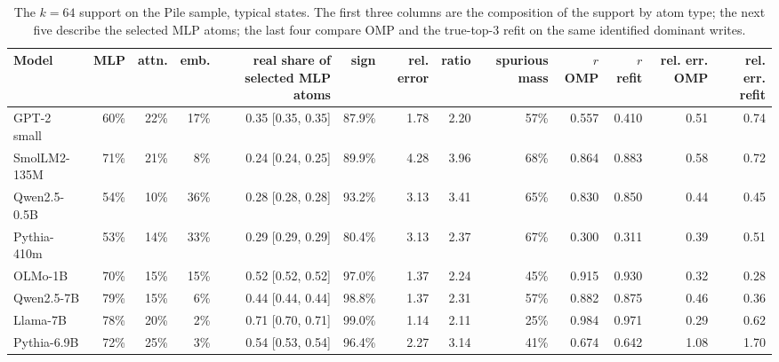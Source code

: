 \begin{table}[H]\centering\scriptsize
\caption{The $k=64$ support on the Pile sample, typical states. The first three columns are the composition of the support by atom type; the next five describe the selected MLP atoms; the last four compare OMP and the true-top-3 refit on the same identified dominant writes.}\label{app:z6-pile}
\begin{adjustbox}{max width=\linewidth}
\begin{tabular}{lrrrrrrrrrrrr}\toprule
Model & MLP & attn. & emb. & real share of selected MLP atoms & sign & rel. error & ratio & spurious mass & $r$ OMP & $r$ refit & rel. err. OMP & rel. err. refit \\ \midrule
GPT-2 small & 60\% & 22\% & 17\% & 0.35 [0.35, 0.35] & 87.9\% & 1.78 & 2.20 & 57\% & 0.557 & 0.410 & 0.51 & 0.74 \\
SmolLM2-135M & 71\% & 21\% & 8\% & 0.24 [0.24, 0.25] & 89.9\% & 4.28 & 3.96 & 68\% & 0.864 & 0.883 & 0.58 & 0.72 \\
Qwen2.5-0.5B & 54\% & 10\% & 36\% & 0.28 [0.28, 0.28] & 93.2\% & 3.13 & 3.41 & 65\% & 0.830 & 0.850 & 0.44 & 0.45 \\
Pythia-410m & 53\% & 14\% & 33\% & 0.29 [0.29, 0.29] & 80.4\% & 3.13 & 2.37 & 67\% & 0.300 & 0.311 & 0.39 & 0.51 \\
OLMo-1B & 70\% & 15\% & 15\% & 0.52 [0.52, 0.52] & 97.0\% & 1.37 & 2.24 & 45\% & 0.915 & 0.930 & 0.32 & 0.28 \\
Qwen2.5-7B & 79\% & 15\% & 6\% & 0.44 [0.44, 0.44] & 98.8\% & 1.37 & 2.31 & 57\% & 0.882 & 0.875 & 0.46 & 0.36 \\
Llama-7B & 78\% & 20\% & 2\% & 0.71 [0.70, 0.71] & 99.0\% & 1.14 & 2.11 & 25\% & 0.984 & 0.971 & 0.29 & 0.62 \\
Pythia-6.9B & 72\% & 25\% & 3\% & 0.54 [0.53, 0.54] & 96.4\% & 2.27 & 3.14 & 41\% & 0.674 & 0.642 & 1.08 & 1.70 \\
\bottomrule\end{tabular}\end{adjustbox}
\end{table}
